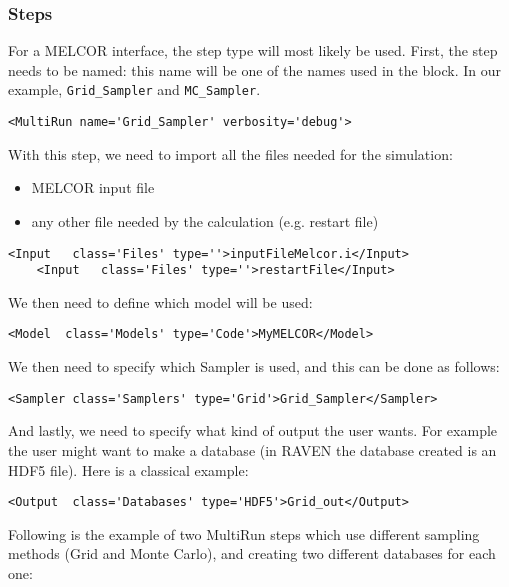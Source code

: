 \subsubsection{Steps}
For a MELCOR interface, the  step type will most likely be
used.
%
First, the step needs to be named: this name will be one of the names used in
the  block.
%
In our example, \texttt{Grid\_Sampler} and \texttt{MC\_Sampler}.
%
\begin{lstlisting}[style=XML,morekeywords={name,debug,re-seeding}]
     <MultiRun name='Grid_Sampler' verbosity='debug'>
\end{lstlisting}

With this step, we need to import all the files needed for the simulation:
\begin{itemize}
  \item MELCOR input file
  \item any other file needed by the calculation (e.g. restart file)
\end{itemize}
\begin{lstlisting}[style=XML,morekeywords={name,class,type}]
    <Input   class='Files' type=''>inputFileMelcor.i</Input>
    <Input   class='Files' type=''>restartFile</Input>
\end{lstlisting}
We then need to define which model will be used:
\begin{lstlisting}[style=XML]
    <Model  class='Models' type='Code'>MyMELCOR</Model>
\end{lstlisting}
We then need to specify which Sampler is used, and this can be done as follows:
\begin{lstlisting}[style=XML]
    <Sampler class='Samplers' type='Grid'>Grid_Sampler</Sampler>
\end{lstlisting}
And lastly, we need to specify what kind of output the user wants.
%
For example the user might want to make a database (in RAVEN the database
created is an HDF5 file).
%
Here is a classical example:
\begin{lstlisting}[style=XML,morekeywords={class,type}]
    <Output  class='Databases' type='HDF5'>Grid_out</Output>
\end{lstlisting}
Following is the example of two MultiRun steps which use different sampling
methods (Grid and Monte Carlo), and creating two different databases for each
one:
